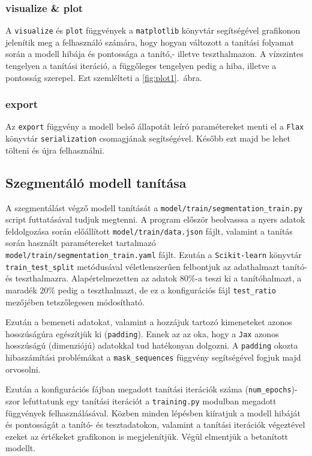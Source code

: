 \subsubsection{visualize \& plot}
A \texttt{visualize} és \texttt{plot} függvények a \texttt{matplotlib}\cite{Hunter:2007} könyvtár
segítségével grafikonon jelenítik meg a felhasználó számára, hogy hogyan változott a tanítási
folyamat során a modell hibája és pontossága a tanító,- illetve teszthalmazon.
A vízszintes tengelyen a tanítási iteráció, a függőleges tengelyen pedig a hiba, illetve a pontosság
szerepel. Ezt szemlélteti a \ref{fig:plot1}.~ábra.

\subsubsection{export}
Az \texttt{export} függvény a modell belső állapotát leíró paramétereket menti el
a \texttt{Flax} könyvtár \texttt{serialization} csomagjának segítségével. Később ezt majd
be lehet tölteni és újra felhasználni.

\subsection{Szegmentáló modell tanítása}
A szegmentálást végző modell tanítását a \texttt{model/train/segmentation\_train.py}
script futtatásával tudjuk megtenni. A program először beolvasssa a nyers adatok feldolgozása
során előállított \texttt{model/train/data.json} fájlt, valamint a tanítás során használt paramétereket
tartalmazó \texttt{model/train/segmentation\_train.yaml} fájlt. Ezután a \texttt{Scikit-learn}\cite{scikit-learn}
könyvtár \texttt{train\_test\_split} metódusával véletlenszerűen felbontjuk az adathalmazt
tanító- és teszthalmazra. Alapértelmezetten az adatok $80\%$-a teszi ki a tanítóhalmazt, a maradék
$20\%$ pedig a teszthalmazt, de ez a konfigurációs fájl \texttt{test\_ratio} mezőjében tetszőlegesen módosítható.

Ezután a bemeneti adatokat, valamint a hozzájuk tartozó kimeneteket azonos hosszúságúra egészítjük ki
(\texttt{padding}). Ennek az az oka, hogy a \texttt{Jax} azonos hosszúságú (dimenziójú) adatokkal tud
hatékonyan dolgozni. A \texttt{padding} okozta hibaszámítási problémákat a \texttt{mask\_sequences}
függvény segítségével fogjuk majd orvosolni.

Ezután a konfigurációs fájban megadott tanítási iterációk száma (\texttt{num\_epochs})-szor
lefuttatunk egy tanítási iterációt a \texttt{training.py} modulban megadott függvények felhasználásával.
Közben minden lépésben kiíratjuk a modell hibáját és pontosságát a tanító- és tesztadatokon, valamint
a tanítási iterációk végeztével ezeket az értékeket grafikonon is megjelenítjük. Végül elmentjük
a betanított modellt.

